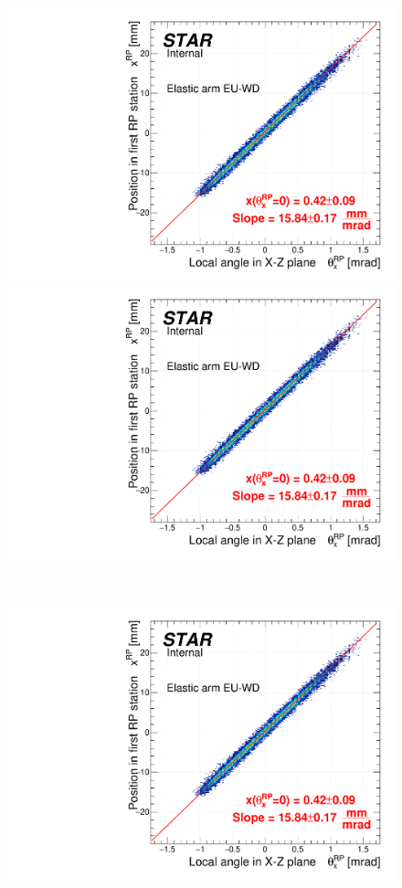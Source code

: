 \begin{figure}[b!]%
\centering\vspace{-7pt}%
\parbox{0.495\textwidth}{
  \centering
  \includegraphics[width=\linewidth,page=1]{graphics/rpSim/VxVy.pdf}\\
  \includegraphics[width=\linewidth,page=2]{graphics/rpSim/VxVy.pdf}
}~
\parbox{0.495\textwidth}{
  \centering
  \includegraphics[width=\linewidth,page=3]{graphics/rpSim/VxVy.pdf}\\
}
\end{figure}
